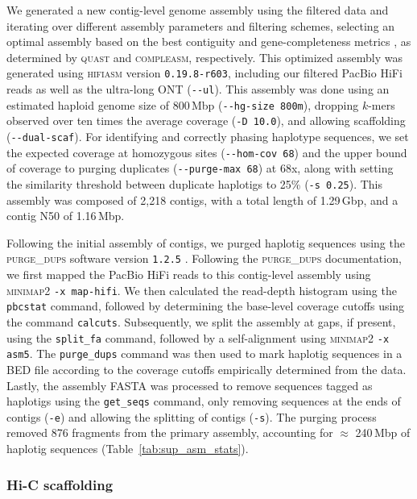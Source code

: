 We generated a new contig-level genome assembly using the filtered data and iterating over
different assembly parameters and filtering schemes,
selecting an optimal assembly based on the best contiguity and gene-completeness
metrics \citep{rayamajhi_evaluating_2022}, as determined by \textsc{quast} and
\textsc{compleasm}, respectively.
This optimized assembly was generated using \textsc{hifiasm} version \texttt{0.19.8-r603},
including our filtered PacBio HiFi reads as well as the ultra-long ONT
(\texttt{-{}-ul}).
This assembly was done using an estimated haploid genome size of 800\,Mbp
(\texttt{-{}-hg-size 800m}), dropping $k$-mers observed over ten times the average coverage
(\texttt{-D 10.0}), and allowing scaffolding (\texttt{-{}-dual-scaf}).
For identifying and correctly phasing haplotype sequences, we set the expected coverage
at homozygous sites (\texttt{-{}-hom-cov 68}) and the upper bound of coverage to purging
duplicates (\texttt{-{}-purge-max 68}) at 68x, along with setting the similarity threshold
between duplicate haplotigs to 25\% (\texttt{-s 0.25}).
This assembly was composed of 2{,}218 contigs, with a total length of 1.29\,Gbp, and a contig
N50 of 1.16\,Mbp.
\vspace{0.1cm}

Following the initial assembly of contigs, we purged haplotig sequences using the
\textsc{purge\_dups} software version \texttt{1.2.5} \citep{guan_identifying_2020}.
Following the \textsc{purge\_dups} documentation, we first mapped the PacBio HiFi
reads to this contig-level assembly using \textsc{minimap2} \texttt{-x map-hifi}.
We then calculated the read-depth histogram using the \texttt{pbcstat} command,
followed by determining the base-level coverage cutoffs using the command
\texttt{calcuts}. Subsequently, we split the assembly at gaps, if present, using
the \texttt{split\_fa} command, followed by a self-alignment using \textsc{minimap2}
\texttt{-x asm5}. The \texttt{purge\_dups} command was then used to mark haplotig
sequences in a BED file according to the coverage cutoffs empirically determined
from the data. Lastly, the assembly FASTA was processed to remove sequences tagged
as haplotigs using the \texttt{get\_seqs} command, only removing sequences at the
ends of contigs (\texttt{-e}) and allowing the splitting of contigs (\texttt{-s}).
The purging process removed 876 fragments from the primary assembly, accounting for
$\approx$ 240\,Mbp of haplotig sequences (Table~\ref{tab:sup_asm_stats}).

\subsubsection*{Hi-C scaffolding}

